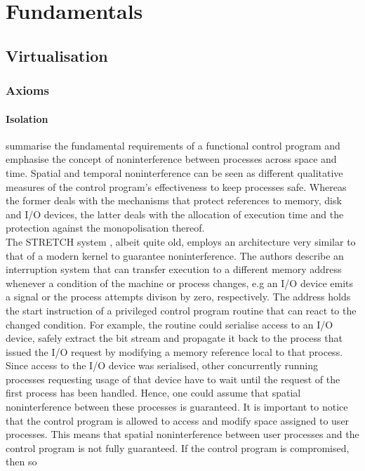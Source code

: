 \chapter{Fundamentals}
\section{Virtualisation}
\subsection{Axioms}
\subsubsection{Isolation}
\textcite{10.1145/368481.368502} summarise the fundamental
requirements of a functional control program and emphasise the concept of
noninterference between processes across space and time. Spatial and temporal noninterference 
can be seen as different qualitative measures of the control program's effectiveness to keep
processes safe. Whereas the former deals with the mechanisms that protect references to memory, disk
and I/O devices, the latter deals with the allocation of execution time and the protection against 
the monopolisation thereof.\\ 
The STRETCH system \cite{10.1145/368481.368502}, albeit quite old, 
employs an architecture very similar to that of a modern kernel to guarantee noninterference. 
The authors describe an interruption system that can transfer execution to a 
different memory address whenever a condition of the machine or process changes, e.g 
an I/O device emits a signal or the process attempts divison by zero, respectively.
The address holds the start instruction of a privileged control program routine that can react to the 
changed condition. For example, the routine could serialise access to an I/O device,
safely extract the bit stream and propagate it back to the process that issued the I/O request
by modifying a memory reference local to that process. Since access to the I/O device was 
serialised, other concurrently running processes requesting usage of that device have to wait
until the request of the first process has been handled. Hence, one could assume that spatial 
noninterference between these processes is guaranteed.
It is important to notice that the control program is allowed to access and 
modify space assigned to user processes. This means that spatial noninterference between user processes 
and the control program is not fully guaranteed. If the control program is compromised, then so 

